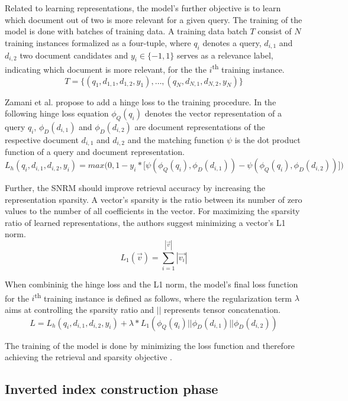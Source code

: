 Related to learning representations, the model's further objective is
    to learn which document out of two is more relevant for a given query.
The training of the model is done with batches of training data.
A training data batch $T$ consist of $N$ training instances
    formalized as a four-tuple, where
    $q_i$ denotes a query, 
    $d_{i,1}$ and $d_{i,2}$ two document candidates and
    $y_i \in \{-1,1\}$ serves as a relevance label, indicating which document
    is more relevant, for the the $i$\textsuperscript{th} training instance.
\[
T=\{ (q_1,d_{1,1},d_{1,2},y_1), \ldots, (q_N,d_{N,1},d_{N,2},y_N)\}
\]

Zamani et al. propose to add a hinge loss to the training procedure.
In the following hinge loss equation 
    $\phi_Q(q_i)$ denotes the vector representation of a query $q_i$,
    $\phi_D(d_{i,1})$ and $\phi_D(d_{i,2})$ are document representations 
    of the respective document $d_{i,1}$ and $d_{i,2}$ and
    the matching function $\psi$ is the dot product function of a query and 
    document representation.
\[
L_{h}(q_i, d_{i,1}, d_{i,2}, y_i) = max\bigl(0,1 - y_i * \bigl[ \psi(\phi_Q(q_i), \phi_D(d_{i,1})) - \psi(\phi_Q(q_i), \phi_D(d_{i,2})) \bigr] \bigr)
\]

Further, the SNRM should improve retrieval accuracy by increasing the representation 
    sparsity.
A vector's sparsity is the ratio between its number of zero values to 
    the number of all coefficients in the vector.
For maximizing the sparsity ratio of learned representations,
    the authors suggest minimizing a vector's L1 norm.
\[
L_1(\vec{v}) = \sum_{i=1}^{\left |  \vec{v}\right |} \left |  \vec{v_i}\right |
\]

When combininig the hinge loss and the L1 norm, the model's final loss function 
    for the $i$\textsuperscript{th} training instance is defined as follows,
    where the regularization term $\lambda$ aims at controlling the sparsity
    ratio and $||$ represents tensor concatenation.
\[
L = L_{h}(q_i, d_{i,1}, d_{i,2}, y_i) + \lambda * L_1(\phi_Q(q_i)||\phi_D(d_{i,1})||\phi_D(d_{i,2}))
\]

The training of the model is done by minimizing the loss function and therefore 
    achieving the retrieval and sparsity objective
    \cite{zamani:2018:from-neural-reranking-to-neural-ranking}.

\subsection*{Inverted index construction phase}

